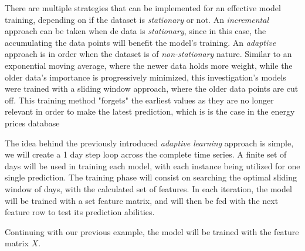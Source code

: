 \documentclass[12pt]{report} %
\begin{document}
There are multiple strategies that can be implemented for an effective model training, depending on if the dataset is \textit{stationary} or not. An \textit{incremental} approach can be taken when de data is  \textit{stationary}, since in this case, the accumulating the data points will benefit the model's training. An \textit{adaptive} approach is in order when the dataset is of \textit{non-stationary} nature. Similar to an exponential moving average, where the newer data holds more weight, while the older data's importance is progressively minimized, this investigation's models were trained with a sliding window approach, where the older data points are cut off. This training method "forgets" the earliest values as they are no longer relevant in order to make the latest prediction, which is is the case in the energy prices database

The idea behind the previously introduced \textit{adaptive learning} approach is simple, we will create a 1 day step loop across the complete time series. A finite set of days will be used in training each model, with each instance being utilized for one single prediction. The training phase will consist on searching the optimal sliding window of days, with the calculated set of features. In each iteration, the model will be trained with a set feature matrix, and will then be fed with the next feature row to test its prediction abilities.

Continuing with our previous example, the model will be trained with the feature matrix $\mathit{X}$.
\end{document}
